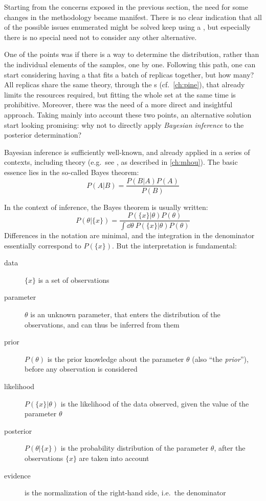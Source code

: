 
Starting from the concerns exposed in the previous section, the need for some
changes in the methodology became manifest.
%
There is no clear indication that all of the possible issues enumerated might
be solved keep using a \nn, but especially there is no special need not to
consider any other alternative.

One of the points was if there is a way to determine the distribution, rather
than the individual elements of the samples, one by one.
%
Following this path, one can start considering having a \nn that fits a batch
of replicas together, but how many?
%
All replicas share the same theory, through the \fktab{}s (cf.\
\cref{ch:pine}), that already limits the resources required, but fitting the
whole set at the same time is prohibitive.
%
Moreover, there was the need of a more direct and insightful approach.
%
Taking mainly into account these two points, an alternative solution start
looking promising: why not to directly apply \textit{Bayesian inference} to the
\pdf posterior determination?

Bayesian inference is sufficiently well-known, and already applied in a series
of contexts, including \hep theory (e.g.\ see \cite{Cacciari:2011ze}, as
described in \cref{ch:mhou}).
%
The basic essence lies in the so-called Bayes theorem:
\begin{equation}
  P(A|B) = \frac{P(B|A) P(A)}{P(B)}
  \label{eq:gp/bayes}
\end{equation}

In the context of inference, the Bayes theorem is usually written:
\begin{equation}
  P\left(\theta|\{x\}\right) = \frac{P\left(\{x\}|\theta\right) P\left(\theta\right)}{
    \int \dd\theta~ P\left(\{x\}|\theta\right) P\left(\theta\right)
  }
  \label{eq:gp/bayes-inf}
\end{equation}
Differences in the notation are minimal, and the integration in the denominator
essentially correspond to $P(\{x\})$.
%
But the interpretation is fundamental:
\begin{description}
  \item[data] $\{x\}$ is a set of observations
  \item[parameter] $\theta$ is an unknown parameter, that enters the
    distribution of the observations, and can thus be inferred from them
  \item[prior] $P(\theta)$ is the prior knowledge about the parameter $\theta$
    (also \enquote{the \textit{prior}}), before any observation is considered
  \item[likelihood] $P\left(\{x\}|\theta\right)$ is the likelihood of the data
    observed, given the value of the parameter $\theta$
  \item[posterior] $P\left(\theta|\{x\}\right)$ is the probability distribution
    of the parameter $\theta$, after the observations $\{x\}$ are taken into
    account
  \item[evidence] is the normalization of the right-hand side, i.e.\ the
    denominator
\end{description}

